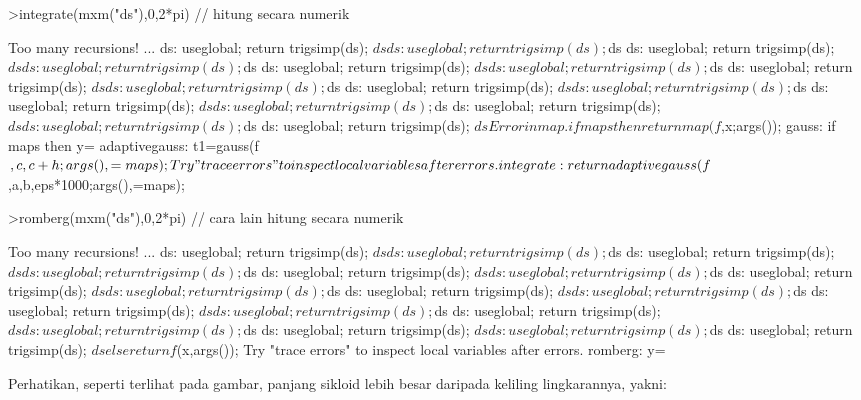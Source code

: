 \documentclass[a4paper,10pt]{article}
\begin{document}
\begin{eulernotebook}
\begin{eulercomment}
\begin{eulercomment}
\begin{eulercomment}
\begin{eulercomment}
\begin{eulerprompt}
>integrate(mxm("ds"),0,2*pi) // hitung secara numerik
\end{eulerprompt}
\begin{euleroutput}
  Too many recursions!
  ...
  ds:
      useglobal; return trigsimp(ds); $ds 
  ds:
      useglobal; return trigsimp(ds); $ds 
  ds:
      useglobal; return trigsimp(ds); $ds 
  ds:
      useglobal; return trigsimp(ds); $ds 
  ds:
      useglobal; return trigsimp(ds); $ds 
  ds:
      useglobal; return trigsimp(ds); $ds 
  ds:
      useglobal; return trigsimp(ds); $ds 
  ds:
      useglobal; return trigsimp(ds); $ds 
  ds:
      useglobal; return trigsimp(ds); $ds 
  ds:
      useglobal; return trigsimp(ds); $ds 
  ds:
      useglobal; return trigsimp(ds); $ds 
  ds:
      useglobal; return trigsimp(ds); $ds 
  ds:
      useglobal; return trigsimp(ds); $ds 
  ds:
      useglobal; return trigsimp(ds); $ds 
  ds:
      useglobal; return trigsimp(ds); $ds 
  Error in map.
      if maps then return map(f$,x;args());
  gauss:
      if maps then y=%
  adaptivegauss:
      t1=gauss(f$,c,c+h;args(),=maps);
  Try "trace errors" to inspect local variables after errors.
  integrate:
      return adaptivegauss(f$,a,b,eps*1000;args(),=maps);
\end{euleroutput}
\begin{eulerprompt}
>romberg(mxm("ds"),0,2*pi) // cara lain hitung secara numerik
\end{eulerprompt}
\begin{euleroutput}
  Too many recursions!
  ...
  ds:
      useglobal; return trigsimp(ds); $ds 
  ds:
      useglobal; return trigsimp(ds); $ds 
  ds:
      useglobal; return trigsimp(ds); $ds 
  ds:
      useglobal; return trigsimp(ds); $ds 
  ds:
      useglobal; return trigsimp(ds); $ds 
  ds:
      useglobal; return trigsimp(ds); $ds 
  ds:
      useglobal; return trigsimp(ds); $ds 
  ds:
      useglobal; return trigsimp(ds); $ds 
  ds:
      useglobal; return trigsimp(ds); $ds 
  ds:
      useglobal; return trigsimp(ds); $ds 
  ds:
      useglobal; return trigsimp(ds); $ds 
  ds:
      useglobal; return trigsimp(ds); $ds 
  ds:
      useglobal; return trigsimp(ds); $ds 
  ds:
      useglobal; return trigsimp(ds); $ds 
  ds:
      useglobal; return trigsimp(ds); $ds 
  ds:
      useglobal; return trigsimp(ds); $ds 
  ds:
      useglobal; return trigsimp(ds); $ds 
      else return f$(x,args());
  Try "trace errors" to inspect local variables after errors.
  romberg:
      y=%
\end{euleroutput}
\begin{eulercomment}
Perhatikan, seperti terlihat pada gambar, panjang sikloid lebih besar daripada keliling lingkarannya, yakni:


\end{eulercomment}
\end{eulercomment}
\end{eulercomment}
\end{eulercomment}
\end{eulercomment}
\end{eulernotebook}
\end{document}
